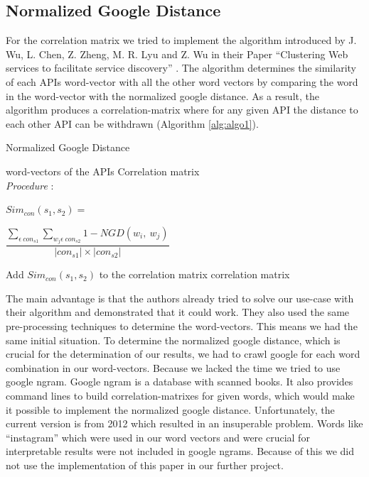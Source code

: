 \documentclass[a4paper]{IEEEtran}
\begin{document}
\subsection{Normalized Google Distance}
For the correlation matrix we tried to implement the algorithm introduced by J. Wu, L. Chen, Z. Zheng, M. R. Lyu and Z. Wu in their Paper “Clustering Web services to facilitate service discovery” \cite{wu2014}. The algorithm determines the similarity of each APIs word-vector with all the other word vectors by comparing the word in the word-vector with the normalized google distance. As a result, the algorithm produces a correlation-matrix where for any given API the distance to each other API can be withdrawn (Algorithm \ref{alg:algo1}).

\begin{algorithm}[H]
\caption{Normalized Google Distance}
\label{alg:algo1}
 \begin{algorithmic}[1]
\renewcommand{\algorithmicrequire}{\textbf{Input:}}
 \renewcommand{\algorithmicensure}{\textbf{Output:}}
 \REQUIRE word-vectors of the APIs
 \ENSURE  Correlation matrix
 \\ \textit{Procedure} :
\STATE 
\parbox[c][1cm]{1\linewidth}{
$Sim_{con}(s_1,s_2)=$
}
\parbox[c][1cm]{1\linewidth}{
$\dfrac{\sum_{\epsilon\ {con}_{s1}}\sum_{w_j\epsilon\ {con}_{s2}}{1-NGD(w_i,\ w_j)}}{\left|{con}_{s1}\right|\times\left|{con}_{s2}\right|}$
}
 \STATE Add ${Sim}_{con}\left(s_1,s_2\right)$ to the correlation matrix 
\ENDFOR
\ENDFOR
\RETURN correlation matrix
 \end{algorithmic}
 \end{algorithm}


The main advantage is that the authors already tried to solve our use-case with their algorithm and demonstrated that it could work. They also used the same pre-processing techniques to determine the word-vectors. This means we had the same initial situation.
To determine the normalized google distance, which is crucial for the determination of our results, we had to crawl google for each word combination in our word-vectors. Because we lacked the time we tried to use google ngram. Google ngram is a database with scanned books. It also provides command lines to build correlation-matrixes for given words, which would make it possible to implement the normalized google distance. Unfortunately, the current version is from 2012 which resulted in an insuperable problem. Words like “instagram” which were used in our word vectors and were crucial for interpretable results were not included in google ngrams. Because of this we did not use the implementation of this paper in our further project.
\end{document}

